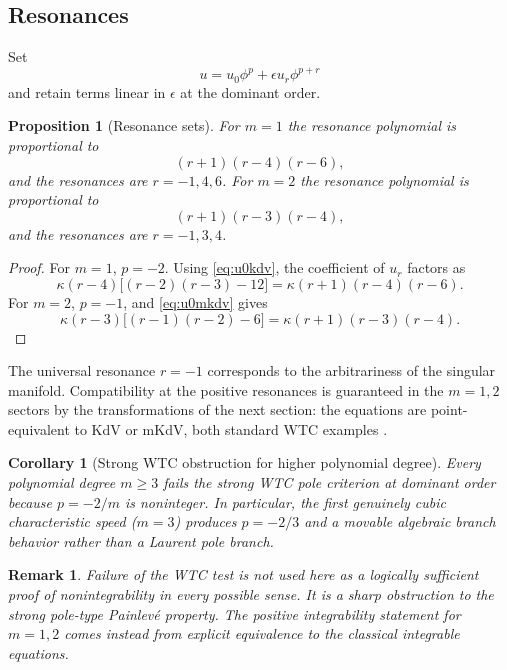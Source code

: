 \documentclass[11pt]{article}
\newtheorem{proposition}[theorem]{Proposition}
\newtheorem{corollary}[theorem]{Corollary}
\newtheorem{remark}[theorem]{Remark}
\begin{document}
\subsection{Resonances}
Set
\begin{equation}
 u=u_0\phi^p+\epsilon u_r\phi^{p+r}
 \label{eq:respert}
\end{equation}
and retain terms linear in $\epsilon$ at the dominant order.

\begin{proposition}[Resonance sets]
For $m=1$ the resonance polynomial is proportional to
\begin{equation}
 (r+1)(r-4)(r-6),
\end{equation}
and the resonances are $r=-1,4,6$.  For $m=2$ the resonance polynomial is proportional to
\begin{equation}
 (r+1)(r-3)(r-4),
\end{equation}
and the resonances are $r=-1,3,4$.
\end{proposition}

\begin{proof}
For $m=1$, $p=-2$.  Using \eqref{eq:u0kdv}, the coefficient of $u_r$ factors as
\[
 \kappa(r-4)\bigl[(r-2)(r-3)-12\bigr]
 =\kappa(r+1)(r-4)(r-6).
\]
For $m=2$, $p=-1$, and \eqref{eq:u0mkdv} gives
\[
 \kappa(r-3)\bigl[(r-1)(r-2)-6\bigr]
 =\kappa(r+1)(r-3)(r-4).
\]
\end{proof}

The universal resonance $r=-1$ corresponds to the arbitrariness of the singular manifold.  Compatibility at the positive resonances is guaranteed in the $m=1,2$ sectors by the transformations of the next section: the equations are point-equivalent to KdV or mKdV, both standard WTC examples \citep{weiss1983,weiss1983b}.

\begin{corollary}[Strong WTC obstruction for higher polynomial degree]
Every polynomial degree $m\ge3$ fails the strong WTC pole criterion at dominant order because $p=-2/m$ is noninteger.  In particular, the first genuinely cubic characteristic speed ($m=3$) produces $p=-2/3$ and a movable algebraic branch behavior rather than a Laurent pole branch.
\end{corollary}

\begin{remark}
Failure of the WTC test is not used here as a logically sufficient proof of nonintegrability in every possible sense.  It is a sharp obstruction to the strong pole-type Painlev\'e property.  The positive integrability statement for $m=1,2$ comes instead from explicit equivalence to the classical integrable equations.
\end{remark}
\end{document}
